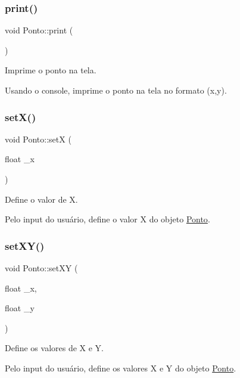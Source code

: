 \subsubsection{\texorpdfstring{print()}{print()}}
{\footnotesize\ttfamily void Ponto\+::print (\begin{DoxyParamCaption}{ }\end{DoxyParamCaption})}



Imprime o ponto na tela. 

Usando o console, imprime o ponto na tela no formato (x,y). \mbox{\label{class_ponto_a22129ad4dbf8019c479021d70a9f6774}} 
\subsubsection{\texorpdfstring{set\+X()}{setX()}}
{\footnotesize\ttfamily void Ponto\+::setX (\begin{DoxyParamCaption}\item[{float}]{\+\_\+x }\end{DoxyParamCaption})}



Define o valor de X. 

Pelo input do usuário, define o valor X do objeto \mbox{\hyperlink{class_ponto}{Ponto}}. \mbox{\label{class_ponto_a827488219a7da184d440f687cec49ce6}} 
\subsubsection{\texorpdfstring{set\+X\+Y()}{setXY()}}
{\footnotesize\ttfamily void Ponto\+::set\+XY (\begin{DoxyParamCaption}\item[{float}]{\+\_\+x,  }\item[{float}]{\+\_\+y }\end{DoxyParamCaption})}



Define os valores de X e Y. 

Pelo input do usuário, define os valores X e Y do objeto \mbox{\hyperlink{class_ponto}{Ponto}}. \mbox{\label{class_ponto_a2d9e5b9fade9d3f3f21122a2dc2f5e11}} 
